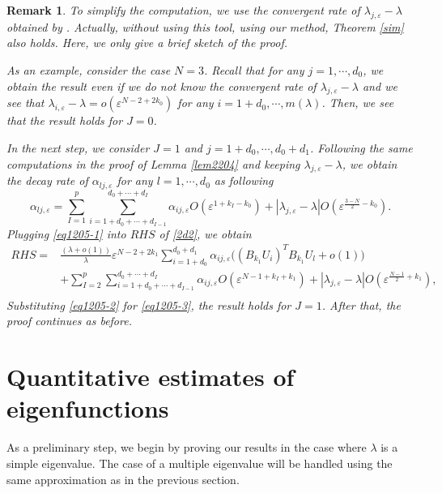 \documentclass[11pt,reqno]{article}
\newtheorem{rem}[teo]{Remark}
\numberwithin{equation}{section}
\newcommand\e\varepsilon
\newcommand\la\lambda
\begin{document}
\begin{rem}\label{rem-withoutalm}
    To simplify the computation, we use the convergent rate of $\lambda_{j,\e}-\lambda$ obtained by \cite{alm1,alm2}. Actually, without using this tool, using our method, Theorem \ref{sim} also holds. Here, we only give a brief sketch of the proof.  

As an example, consider the case $N=3$.
    Recall that for any $j=1,\cdots,d_0$, we obtain the result  even if we do not know  the convergent rate of $\lambda_{j,\e}-\lambda$ and we see that $\lambda_{i,\e}-\lambda=o(\e^{N-2+2k_0})$ for any $i=1+d_0,\cdots,m(\lambda)$. Then, we see that the result holds for $J=0$. 

    In the next step, we consider $J=1$ and $j=1+d_0,\cdots,d_0+d_1$. Following the same computations in the proof of Lemma \ref{lem2204} and keeping $\lambda_{j,\e}-\lambda$, we obtain the decay rate of $\alpha_{lj,\e}$ for any $l=1,\cdots,d_0$ as following 
    \begin{equation}\label{eq1205-1}
         \alpha_{lj,\e}=\sum_{I=1}^p\sum_{i=1+d_0+\cdots+d_{I-1}}^{d_0+\cdots+d_I}\alpha_{ij,\e}O(\e^{1+k_I-k_0})+|\lambda_{j,\e}-\lambda|O(\e^{\frac{3-N}{2}-k_0}).
    \end{equation}
  Plugging \eqref{eq1205-1} into $RHS$ of \eqref{2d2}, we obtain 
    \begin{equation}\label{eq1205-2}
\begin{aligned}
      RHS=&
				\frac{(\la+o(1))}{\la }\e^{N-2+2k_1}\sum_{i=1+d_0}^{d_0+d_1}\alpha_{ij,\e}\Bigg((B_{k_1}U_i)^TB_{k_1}U_l+o(1)\Bigg)\\
                &+\sum_{I=2}^p\sum_{i=1+d_0+\cdots+d_{I-1}}^{d_0+\cdots+d_I}\alpha_{ij,\e}O(\e^{N-1+{ k_I}+{ k_1}})+|\lambda_{j,\e}-\lambda|O(\e^{\frac{N-1}{2}+k_1}),\\
                \end{aligned}
\end{equation}
Substituting \eqref{eq1205-2} for \eqref{eq1205-3}, the result holds for $J=1$.  After that, the proof continues as before.
\end{rem}


	
	
	\section{Quantitative estimates of eigenfunctions}\label{sec-function}
As a preliminary step, we begin by proving our results in the case where $\la$ is a simple eigenvalue. The case of a multiple eigenvalue will be handled using the same approximation as in the previous section.
\end{document}

